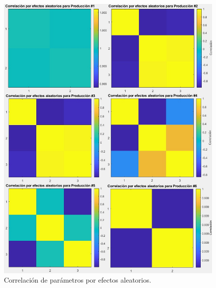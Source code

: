 \begin{figure}[H]
	 \begin{center}
	 \includegraphics[scale=0.64]{img/covmatricesspa.jpg}
	 \end{center}
	 \caption{Correlación de parámetros por efectos aleatorios. \label{covmatricespng}}
\end{figure}

\pagebreak


